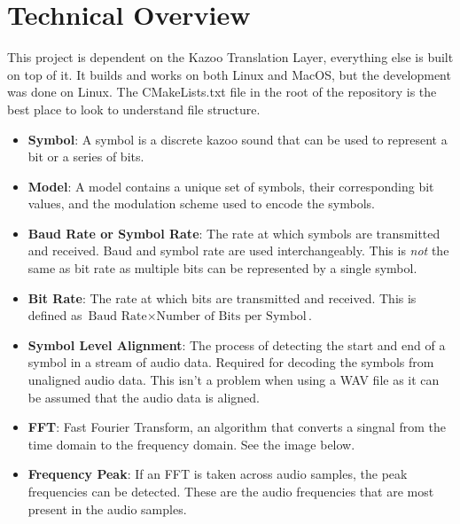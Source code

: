 \documentclass[]{article}
\begin{document}
\section{Technical Overview}



This project is dependent on the Kazoo Translation Layer, everything else is built on top of it. It builds and works on both Linux and MacOS, but the development was done on Linux. The CMakeLists.txt file in the root of the repository is the best place to look to understand file structure.

\begin{itemize}
  \item \textbf{Symbol}: A symbol is a discrete kazoo sound that can be used to represent a bit or a series of bits.
  \item \textbf{Model}: A model contains a unique set of symbols, their corresponding bit values, and the modulation scheme used to encode the symbols.
  \item \textbf{Baud Rate or Symbol Rate}: The rate at which symbols are transmitted and received. Baud and symbol rate are used interchangeably. This is \textit{not} the same as bit rate as multiple bits can be represented by a single symbol.
  \item \textbf{Bit Rate}: The rate at which bits are transmitted and received. This is defined as $\text{Baud Rate} \times \text{Number of Bits per Symbol}$.
  \item \textbf{Symbol Level Alignment}: The process of detecting the start and end of a symbol in a stream of audio data. Required for decoding the symbols from unaligned audio data. This isn't a problem when using a WAV file as it can be assumed that the audio data is aligned.
  \item \textbf{FFT}: Fast Fourier Transform, an algorithm that converts a singnal from the time domain to the frequency domain. See the image below.
  \item \textbf{Frequency Peak}: If an FFT is taken across audio samples, the peak frequencies can be detected. These are the audio frequencies that are most present in the audio samples.
\end{itemize}
\end{document}
